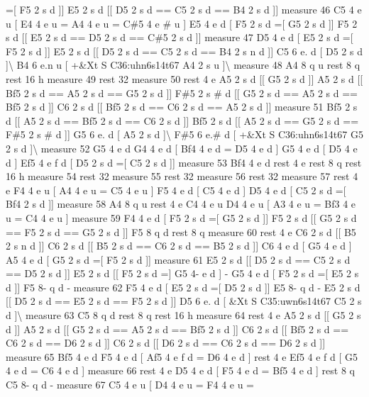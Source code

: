 =\mbox{[} F5 2 s d \mbox{]}\mbox{]} E5 2 s d \mbox{[}\mbox{[} D5 2 s d == C5 2 s d == B4 2 s d \mbox{]}\mbox{]} measure 46 C5 4 e u \mbox{[} E4 4 e u = A4 4 e u = C\#5 4 e \# u \mbox{]} E5 4 e d \mbox{[} F5 2 s d =\mbox{[} G5 2 s d \mbox{]}\mbox{]} F5 2 s d \mbox{[}\mbox{[} E5 2 s d == D5 2 s d == C\#5 2 s d \mbox{]}\mbox{]} measure 47 D5 4 e d \mbox{[} E5 2 s d =\mbox{[} F5 2 s d \mbox{]}\mbox{]} E5 2 s d \mbox{[}\mbox{[} D5 2 s d == C5 2 s d == B4 2 s n d \mbox{]}\mbox{]} C5 6 e. d \mbox{[} D5 2 s d \mbox{]}\textbackslash{} B4 6 e.\+n u \mbox{[} +\&Xt S C36\+:uhn6s14t67 A4 2 s u \mbox{]}\textbackslash{} measure 48 A4 8 q u rest 8 q rest 16 h measure 49 rest 32 measure 50 rest 4 e A5 2 s d \mbox{[}\mbox{[} G5 2 s d \mbox{]}\mbox{]} A5 2 s d \mbox{[}\mbox{[} Bf5 2 s d == A5 2 s d == G5 2 s d \mbox{]}\mbox{]} F\#5 2 s \# d \mbox{[}\mbox{[} G5 2 s d == A5 2 s d == Bf5 2 s d \mbox{]}\mbox{]} C6 2 s d \mbox{[}\mbox{[} Bf5 2 s d == C6 2 s d == A5 2 s d \mbox{]}\mbox{]} measure 51 Bf5 2 s d \mbox{[}\mbox{[} A5 2 s d == Bf5 2 s d == C6 2 s d \mbox{]}\mbox{]} Bf5 2 s d \mbox{[}\mbox{[} A5 2 s d == G5 2 s d == F\#5 2 s \# d \mbox{]}\mbox{]} G5 6 e. d \mbox{[} A5 2 s d \mbox{]}\textbackslash{} F\#5 6 e.\# d \mbox{[} +\&Xt S C36\+:uhn6s14t67 G5 2 s d \mbox{]}\textbackslash{} measure 52 G5 4 e d G4 4 e d \mbox{[} Bf4 4 e d = D5 4 e d \mbox{]} G5 4 e d \mbox{[} D5 4 e d \mbox{]} Ef5 4 e f d \mbox{[} D5 2 s d =\mbox{[} C5 2 s d \mbox{]}\mbox{]} measure 53 Bf4 4 e d rest 4 e rest 8 q rest 16 h measure 54 rest 32 measure 55 rest 32 measure 56 rest 32 measure 57 rest 4 e F4 4 e u \mbox{[} A4 4 e u = C5 4 e u \mbox{]} F5 4 e d \mbox{[} C5 4 e d \mbox{]} D5 4 e d \mbox{[} C5 2 s d =\mbox{[} Bf4 2 s d \mbox{]}\mbox{]} measure 58 A4 8 q u rest 4 e C4 4 e u D4 4 e u \mbox{[} A3 4 e u = Bf3 4 e u = C4 4 e u \mbox{]} measure 59 F4 4 e d \mbox{[} F5 2 s d =\mbox{[} G5 2 s d \mbox{]}\mbox{]} F5 2 s d \mbox{[}\mbox{[} G5 2 s d == F5 2 s d == G5 2 s d \mbox{]}\mbox{]} F5 8 q d rest 8 q measure 60 rest 4 e C6 2 s d \mbox{[}\mbox{[} B5 2 s n d \mbox{]}\mbox{]} C6 2 s d \mbox{[}\mbox{[} B5 2 s d == C6 2 s d == B5 2 s d \mbox{]}\mbox{]} C6 4 e d \mbox{[} G5 4 e d \mbox{]} A5 4 e d \mbox{[} G5 2 s d =\mbox{[} F5 2 s d \mbox{]}\mbox{]} measure 61 E5 2 s d \mbox{[}\mbox{[} D5 2 s d == C5 2 s d == D5 2 s d \mbox{]}\mbox{]} E5 2 s d \mbox{[}\mbox{[} F5 2 s d =\mbox{]} G5 4-\/ e d \mbox{]} -\/ G5 4 e d \mbox{[} F5 2 s d =\mbox{[} E5 2 s d \mbox{]}\mbox{]} F5 8-\/ q d -\/ measure 62 F5 4 e d \mbox{[} E5 2 s d =\mbox{[} D5 2 s d \mbox{]}\mbox{]} E5 8-\/ q d -\/ E5 2 s d \mbox{[}\mbox{[} D5 2 s d == E5 2 s d == F5 2 s d \mbox{]}\mbox{]} D5 6 e. d \mbox{[} \&Xt S C35\+:uwn6s14t67 C5 2 s d \mbox{]}\textbackslash{} measure 63 C5 8 q d rest 8 q rest 16 h measure 64 rest 4 e A5 2 s d \mbox{[}\mbox{[} G5 2 s d \mbox{]}\mbox{]} A5 2 s d \mbox{[}\mbox{[} G5 2 s d == A5 2 s d == Bf5 2 s d \mbox{]}\mbox{]} C6 2 s d \mbox{[}\mbox{[} Bf5 2 s d == C6 2 s d == D6 2 s d \mbox{]}\mbox{]} C6 2 s d \mbox{[}\mbox{[} D6 2 s d == C6 2 s d == D6 2 s d \mbox{]}\mbox{]} measure 65 Bf5 4 e d F5 4 e d \mbox{[} Af5 4 e f d = D6 4 e d \mbox{]} rest 4 e Ef5 4 e f d \mbox{[} G5 4 e d = C6 4 e d \mbox{]} measure 66 rest 4 e D5 4 e d \mbox{[} F5 4 e d = Bf5 4 e d \mbox{]} rest 8 q C5 8-\/ q d -\/ measure 67 C5 4 e u \mbox{[} D4 4 e u = F4 4 e u = 